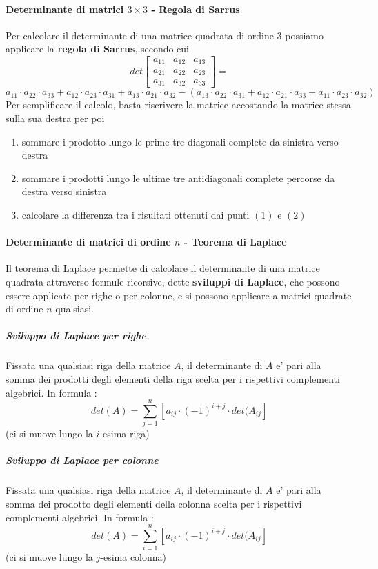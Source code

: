 \documentclass[a4paper, 10pt]{article}
\begin{document}
	\paragraph*{Determinante di matrici $3 \times 3$ - Regola di Sarrus}
	Per calcolare il determinante di una matrice quadrata di ordine 3 possiamo applicare la \textbf{regola di Sarrus}, 
	secondo cui
	\[ det \begin{bmatrix} a_{11} & a_{12} & a_{13} \\ a_{21} & a_{22} & a_{23} \\ a_{31} & a_{32} & a_{33} \end{bmatrix} = \]
	\[ a_{11} \cdot a_{22} \cdot a_{33} + a_{12} \cdot a_{23} \cdot a_{31} + a_{13} \cdot a_{21} \cdot a_{32} - (
	a_{13} \cdot a_{22} \cdot a_{31} + a_{12} \cdot a_{21} \cdot a_{33} + a_{11} \cdot a_{23} \cdot a_{32}) \]
	Per semplificare il calcolo, basta riscrivere la matrice accostando la matrice stessa sulla sua destra per poi
	\begin{enumerate}
		\item sommare i prodotto lungo le prime tre diagonali complete da sinistra verso destra
		\item sommare i prodotti lungo le ultime tre antidiagonali complete percorse da destra verso sinistra
		\item calcolare la differenza tra i risultati ottenuti dai punti $(1)$ e $(2)$
	\end{enumerate}	
	\paragraph*{Determinante di matrici di ordine $n$ - Teorema di Laplace}
	Il teorema di Laplace permette di calcolare il determinante di una matrice quadrata attraverso formule ricorsive, dette
	\textbf{sviluppi di Laplace}, che possono essere applicate per righe o per colonne, e si possono applicare a 
	matrici quadrate di ordine $n$ qualsiasi.

	\subparagraph*{Sviluppo di Laplace per righe}
	Fissata una qualsiasi riga della matrice $A$, il determinante di $A$ e' pari alla somma dei prodotti degli elementi 
	della riga scelta per i rispettivi complementi algebrici. In formula : 
	\[ det(A) = \sum_{j=1}^{n} [a_{ij} \cdot (-1)^{i + j} \cdot det(A_{ij}] \]
	(ci si muove lungo la $i$-esima riga)
	
	\subparagraph*{Sviluppo di Laplace per colonne}
	Fissata una qualsiasi riga della matrice $A$, il determinante di $A$ e' pari alla somma dei prodotto degli elementi 
	della colonna scelta per i rispettivi complementi algebrici. In formula : 
	\[ det(A) = \sum_{i=1}^{n} [a_{ij} \cdot (-1)^{i + j} \cdot det(A_{ij}] \]
	(ci si muove lungo la $j$-esima colonna)
	
\end{document}

